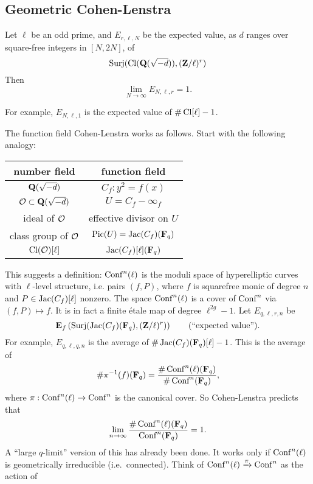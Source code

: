 \subsection{Geometric Cohen-Lenstra}

\begin{conjecture}
Let $\ell$ be an odd prime, and $E_{r,\ell,N}$ be the expected value, as $d$ 
ranges over square-free integers in $[N, 2 N]$, of 
\[
  \operatorname{Surj}(\operatorname{Cl}(\mathbf{Q}(\sqrt{-d})),(\mathbf{Z}/\ell)^r)
\]
Then 
\[
  \lim_{N\to \infty} E_{N,\ell,r} = 1 .
\]
\end{conjecture}

For example, $E_{N,\ell,1}$ is the expected value of $\# \operatorname{Cl}[\ell]-1$. 

The function field Cohen-Lenstra works as follows. Start with the following 
analogy:
\begin{center}
\begin{tabular}{c|c}
number field & function field \\ \hline
$\mathbf{Q}(\sqrt{-d})$ & $C_f:y^2=f(x)$ \\
$\mathcal{O}\subset \mathbf{Q}(\sqrt{-d})$ & $U=C_f-\infty_f$ \\
ideal of $\mathcal{O}$ & effective divisor on $U$ \\
class group of $\mathcal{O}$ & $\operatorname{Pic}(U) = \operatorname{Jac}(C_f)(\mathbf{F}_q)$ \\
$\operatorname{Cl}(\mathcal{O})[\ell]$ & $\operatorname{Jac}(C_f)[\ell](\mathbf{F}_q)$
\end{tabular}
\end{center}
This suggests a definition: $\operatorname{Conf}^n(\ell)$ is the moduli space of 
hyperelliptic curves with $\ell$-level structure, i.e. pairs 
$(f,P)$, where $f$ is squarefree monic of degree $n$ and 
$P\in \operatorname{Jac}(C_f)[\ell]$ nonzero. The space $\operatorname{Conf}^n(\ell)$ is a cover of 
$\operatorname{Conf}^n$ via $(f,P)\mapsto f$. It is in fact a finite \'etale map of degree 
$\ell^{2 g}-1$. Let $E_{q,\ell,r,n}$ be 
\[
  \mathbf{E}_f\left(\operatorname{Surj}(\operatorname{Jac}(C_f)(\mathbf{F}_q),(\mathbf{Z}/\ell)^r)\right) \qquad(\text{``expected value''}).
\]
For example, $E_{q,\ell,q,n}$ is the average of 
$\#\operatorname{Jac}(C_f)(\mathbf{F}_q)[\ell]-1$. This is the average of 
\[
  \#\pi^{-1}(f)(\mathbf{F}_q) = \frac{\#\operatorname{Conf}^n(\ell)(\mathbf{F}_q)}{\#\operatorname{Conf}^n(\mathbf{F}_q)} ,
\]
where $\pi:\operatorname{Conf}^n(\ell) \to \operatorname{Conf}^n$ is the canonical cover. So Cohen-Lenstra 
predicts that 
\[
  \lim_{n\to \infty} \frac{\#\operatorname{Conf}^n(\ell)(\mathbf{F}_q)}{\operatorname{Conf}^n(\mathbf{F}_q)} = 1 .
\]
A ``large $q$-limit'' version of this has already been done. It works only if  
$\operatorname{Conf}^n(\ell)$ is geometrically irreducible (i.e.\ connected). Think of 
$\operatorname{Conf}^n(\ell)\xrightarrow\pi\operatorname{Conf}^n$ as the action of 
